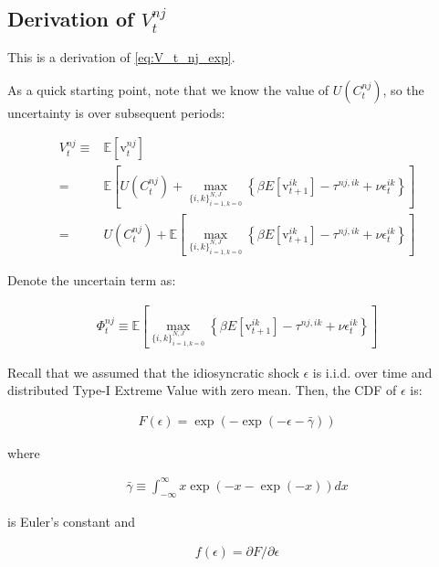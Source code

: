 \documentclass[10pt]{article}
\begin{document}

\subsection{Derivation of $V_t^{n j}$}
\label{sec:V_t_nj_exp}

This is a derivation of \autoref{eq:V_t_nj_exp}.

As a quick starting point, note that we know the 
value of $U\left(C_t^{n j}\right)$, so 
the uncertainty is over subsequent periods:

\begin{align}
    V_t^{n j} \equiv &\mathbb{E}\left[\mathrm{v}_t^{n j}\right] \\
    = &\mathbb{E}\left[U\left(C_t^{n j}\right)+\max _{\{i, k\}_{i=1, k=0}^{N, J}}\left\{\beta E\left[\mathrm{v}_{t+1}^{i k}\right]-\tau^{n j, i k}+\nu \epsilon_t^{i k}\right\}\right] \\
    = &U\left(C_t^{n j}\right)+ \mathbb{E}\left[\max _{\{i, k\}_{i=1, k=0}^{N, J}}\left\{\beta E\left[\mathrm{v}_{t+1}^{i k}\right]-\tau^{n j, i k}+\nu \epsilon_t^{i k}\right\}\right]
\end{align}

Denote the uncertain term as:

\begin{align}
    \Phi_t^{n j} \equiv \mathbb{E}\left[\max _{\{i, k\}_{i=1, k=0}^{N, J}}\left\{\beta E\left[\mathrm{v}_{t+1}^{i k}\right]-\tau^{n j, i k}+\nu \epsilon_t^{i k}\right\}\right]
\end{align}

Recall that we assumed that the idiosyncratic shock $\epsilon$ is i.i.d. over time
and distributed Type-I Extreme Value with zero mean. Then, the 
CDF of $\epsilon$ is:

\begin{align}
    F(\epsilon)=\exp (-\exp (-\epsilon-\bar{\gamma}))
\end{align}

where 

\begin{align}
    \bar{\gamma} \equiv \int_{-\infty}^{\infty} x \exp (-x-\exp (-x)) d x
\end{align}

is Euler's constant and 

\begin{align}
    f(\epsilon)=\partial F / \partial \epsilon
\end{align}
\end{document}
